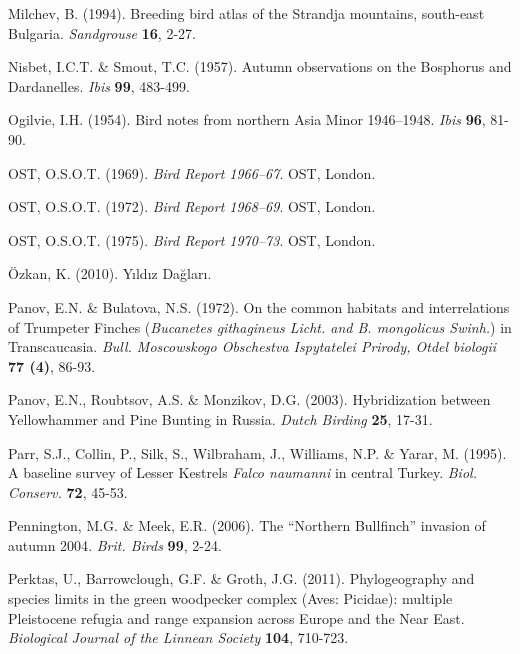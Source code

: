 \documentclass[
  10.5pt,
  a4paper,
  DIV=11,
  numbers=noendperiod,
  twocolumn]{scrreprt}
\newlength{\cslhangindent}
\newenvironment{CSLReferences}[2] %
 {\begin{list}{}{%
  \setlength{\itemindent}{0pt}
  \setlength{\leftmargin}{0pt}
  \setlength{\parsep}{0pt}
  \ifodd #1
   \setlength{\leftmargin}{\cslhangindent}
   \setlength{\itemindent}{-1\cslhangindent}
  \fi
  \setlength{\itemsep}{#2\baselineskip}}}
 {\end{list}}
\begin{document}
\begin{CSLReferences}{1}{1}
Milchev, B. (1994). {Breeding bird atlas of the Strandja mountains,
south-east Bulgaria}. \emph{Sandgrouse} \textbf{16}, 2-27.

Nisbet, I.C.T. \& Smout, T.C. (1957). {Autumn observations on the
Bosphorus and Dardanelles}. \emph{Ibis} \textbf{99}, 483-499.

Ogilvie, I.H. (1954). {Bird notes from northern Asia Minor 1946--1948}.
\emph{Ibis} \textbf{96}, 81-90.

OST, O.S.O.T. (1969). \emph{{Bird Report 1966--67}}. OST, London.

OST, O.S.O.T. (1972). \emph{{Bird Report 1968--69}}. OST, London.

OST, O.S.O.T. (1975). \emph{{Bird Report 1970--73}}. OST, London.

Özkan, K. (2010). {Yıldız Dağları}.

Panov, E.N. \& Bulatova, N.S. (1972). {On the common habitats and
interrelations of Trumpeter Finches (\emph{Bucanetes githagineus Licht.
and B. mongolicus Swinh.}) in Transcaucasia}. \emph{Bull. Moscowskogo
Obschestva Ispytatelei Prirody, Otdel biologii} \textbf{77 (4)}, 86-93.

Panov, E.N., Roubtsov, A.S. \& Monzikov, D.G. (2003). {Hybridization
between Yellowhammer and Pine Bunting in Russia}. \emph{Dutch Birding}
\textbf{25}, 17-31.

Parr, S.J., Collin, P., Silk, S., Wilbraham, J., Williams, N.P. \&
Yarar, M. (1995). {A baseline survey of Lesser Kestrels \emph{Falco
naumanni} in central Turkey}. \emph{Biol. Conserv.} \textbf{72}, 45-53.

Pennington, M.G. \& Meek, E.R. (2006). {The {``Northern Bullfinch''}
invasion of autumn 2004}. \emph{Brit. Birds} \textbf{99}, 2-24.

Perktas, U., Barrowclough, G.F. \& Groth, J.G. (2011). {Phylogeography
and species limits in the green woodpecker complex (Aves: Picidae):
multiple Pleistocene refugia and range expansion across Europe and the
Near East}. \emph{Biological Journal of the Linnean Society}
\textbf{104}, 710-723.


\end{CSLReferences}
\end{document}
